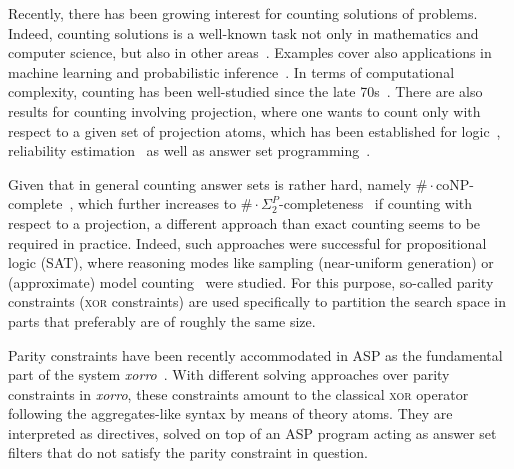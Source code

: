 \documentclass{article}
\newcommand{\XOR}{\textsc{xor}} %
\newcommand{\sysfont}{\textit}
\newcommand{\xorro}{\sysfont{xorro}}
\begin{document}
Recently, there has been growing interest for counting solutions of problems.
%
Indeed, counting solutions is a well-known task not only in mathematics and computer
science, but also in other
areas~\cite{ChakrabortyMeelVardi16a,DomshlakHoffmann07a,GomesKautzSabharwalSelman08a,SangBeameKautz05a}.
%
%
%
Examples cover also applications in machine learning and probabilistic inference~\cite{ChaviraDarwiche08a}.
%
%
In terms of computational complexity, counting has been well-studied since the
late
70s~\cite{DurandHermannKolaitis05,HemaspaandraVollmer95a,Valiant79,Valiant79b}.
%
There are also results for counting involving projection, where one wants to
count only with respect to a given set of projection atoms,
which has been established for logic~\cite{AzizChuMuise15a,CapelliMengel19,FichteEtAl18,LagniezMarquis19a,GuptaSharmaRoy19a,SharmaRoySoos19a},
reliability estimation~\cite{MeelEtAl17a} as well as
answer set programming~\cite{GebserKaufmannSchaub09a,Aziz15a,FichteHecher19}.
%

Given that in general counting answer sets is rather hard, namely ${\#\cdot\text{coNP}}$-complete~\cite{FichteEtAl17,DurandHermannKolaitis05}, which further increases
to ${\#\cdot\Sigma_2^P}$-completeness~\cite{FichteHecher19} if counting with respect to a projection,
a different approach than exact counting seems to be required in practice.
%
Indeed, such approaches were successful for propositional logic (SAT), where reasoning modes like sampling (near-uniform generation)
or (approximate) model counting~\cite{gosase07a,gohosase07b,chmeva13a,chmeva13b,soomee19a}
were studied.
%
For this purpose, so-called parity constraints  (\XOR{} constraints) are used specifically to partition the search space in parts that preferably are of roughly the same size.

Parity constraints have been recently accommodated in ASP
as the fundamental part of the system \xorro{}~\cite{DBLP:conf/lpnmr/EverardoJKS19}.
%
With different solving approaches over parity constraints in \xorro{}, these constraints amount to the classical \XOR{} operator following the aggregates-like syntax by means of theory atoms.
They are interpreted as directives, solved on top of an ASP program acting as answer set filters that do not satisfy the parity constraint in question.
%
\end{document}
